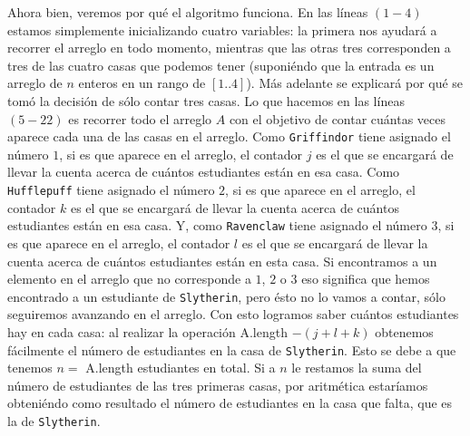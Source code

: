 \documentclass[letterpaper,11pt]{article}
\begin{document}
\begin{enumerate}
    Ahora bien, veremos por qué el algoritmo funciona. En las líneas $(1-4)$ 
    estamos simplemente inicializando cuatro variables: la primera nos ayudará 
    a recorrer el arreglo en todo momento, mientras que las otras tres 
    corresponden a tres de las cuatro casas que podemos tener (suponiéndo que 
    la entrada es un arreglo de $n$ enteros en un rango de $[1..4]$). Más 
    adelante se explicará por qué se tomó la decisión de sólo contar tres casas.
    Lo que hacemos en las líneas $(5 - 22)$ es recorrer todo el arreglo $A$ con 
    el objetivo de contar cuántas veces aparece cada una de las casas en el 
    arreglo. Como \texttt{Griffindor} tiene asignado el número $1$, si es que 
    aparece en el arreglo, el contador $j$ es el que se encargará de llevar la 
    cuenta acerca de cuántos estudiantes están en esa casa. Como 
    \texttt{Hufflepuff} tiene asignado el número $2$, si es que aparece en el 
    arreglo, el contador $k$  es el que se encargará de llevar la cuenta acerca 
    de cuántos estudiantes están en esa casa. Y, como \texttt{Ravenclaw} tiene 
    asignado el número $3$, si es que aparece en el arreglo, el contador $l$ es 
    el que se encargará de llevar la cuenta acerca de cuántos estudiantes están 
    en esta casa. Si encontramos a un elemento en el arreglo que no corresponde 
    a $1$, $2$ o $3$ eso significa que hemos encontrado a un estudiante de 
    \texttt{Slytherin}, pero ésto no lo vamos a contar, sólo seguiremos avanzando
    en el arreglo. Con esto logramos saber cuántos estudiantes hay en cada casa: 
    al realizar la operación A.length $- (j + l + k)$ obtenemos fácilmente el 
    número de estudiantes en la casa de \texttt{Slytherin}. Esto se debe a que 
    tenemos $n = $ A.length estudiantes en total. Si a $n$ le restamos la suma 
    del número de estudiantes de las tres primeras casas, por aritmética
    estaríamos obteniéndo como resultado el número de estudiantes en la casa
    que falta, que es la de \texttt{Slytherin}.


\end{enumerate}
\end{document}
